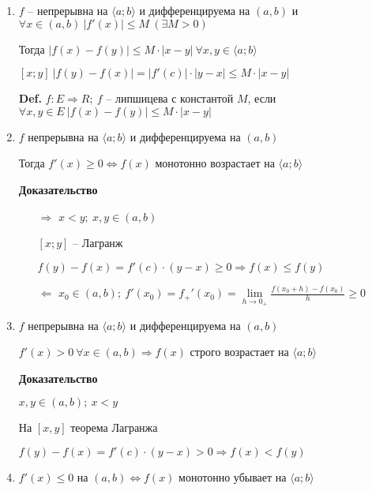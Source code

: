 \documentclass[14pt, letter paper]{article}
\newcommand{\q}[1]{\langle #1 \rangle}
\begin{document}
\begin{enumerate}
    \item $f$ -- непрерывна на $\q{a; b}$ и дифференцируема на $(a, b)$ и $\forall x \in (a, b)\ |f'(x)| \leq M\ (\exists M > 0)$
    
    Тогда $|f(x) - f(y)| \leq M \cdot |x - y|\ \forall x, y \in \q{a; b}$
    
    $[x; y]\ |f(y) - f(x)| = |f'(c)| \cdot |y - x| \leq M \cdot |x - y|$

    \textbf{Def.} $f : E \Rightarrow R;\ f$ -- липшицева с константой $M$, если $\forall x, y \in E\ |f(x) - f(y)| \leq M \cdot |x - y|$

    \item $f$ непрерывна на $\q{a; b}$ и дифференцируема на $(a, b)$ 
    
    Тогда $f'(x) \geq 0 \Leftrightarrow f(x)$ монотонно возрастает на $\q{a; b}$

    \begin{center}
        \textbf{Доказательство}
    \end{center}

    \begin{itemize}
        \item[$\Rightarrow$] $x < y;\ x, y \in (a, b)$
        
        $[x; y]$ -- Лагранж

        $f(y) - f(x) = f'(c) \cdot (y - x) \geq 0 \Rightarrow f(x) \leq f(y)$

        \item[$\Leftarrow$] $x_0 \in (a, b);\ f'(x_0) = f_+'(x_0) = \lim\limits_{h \rightarrow 0_+} \frac{f(x_0 + h) - f(x_0)}{h} \geq 0$
    \end{itemize}

    \item $f$ непрерывна на $\q{a; b}$ и дифференцируема на $(a, b)$
    
    $f'(x) > 0\ \forall x \in (a, b) \Rightarrow f(x)$ строго возрастает на $\q{a; b}$

    \begin{center}
        \textbf{Доказательство}
    \end{center}

    $x, y \in (a, b);\ x < y$

    На $[x, y]$ теорема Лагранжа

    $f(y) - f(x) = f'(c) \cdot (y - x) > 0 \Rightarrow f(x) < f(y)$

    \item $f'(x) \leq 0$ на $(a, b) \Leftrightarrow f(x)$ монотонно убывает на $\q{a; b}$
    

\end{enumerate}
\end{document}
